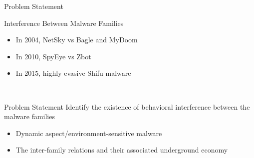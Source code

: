 \documentclass{beamer}
\begin{document}
\begin{frame}[h]{Problem Statement}
  \begin{block}{Interference Between Malware Families}
    \begin{itemize}
      \item In 2004, NetSky vs Bagle and MyDoom
      \item In 2010, SpyEye vs Zbot
      \item In 2015, highly evasive Shifu malware
    \end{itemize}
  \end{block}
  \pause\
  \begin{block}{Problem Statement}
    Identify the existence of behavioral interference between the malware families
      \pause\
    \begin{itemize}
      \item Dynamic aspect/environment-sensitive malware
      \item The inter-family relations and their associated underground economy
    \end{itemize}
  \end{block}
\end{frame}
\end{document}
